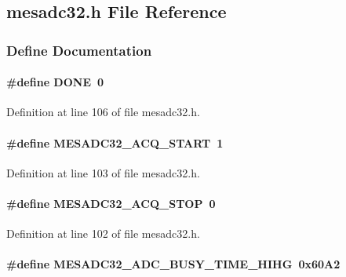 \subsection{mesadc32.h File Reference}
\label{mesadc32_8h}


\subsubsection{Define Documentation}
\paragraph[{DONE}]{\setlength{\rightskip}{0pt plus 5cm}\#define DONE~0}\hfill\label{mesadc32_8h_abe6b865c045f3e7c6892ef4f15ff5779}


Definition at line 106 of file mesadc32.h.
\paragraph[{MESADC32\_\-ACQ\_\-START}]{\setlength{\rightskip}{0pt plus 5cm}\#define MESADC32\_\-ACQ\_\-START~1}\hfill\label{mesadc32_8h_a5373a7a19002a8e75d304788f4fbaa33}


Definition at line 103 of file mesadc32.h.
\paragraph[{MESADC32\_\-ACQ\_\-STOP}]{\setlength{\rightskip}{0pt plus 5cm}\#define MESADC32\_\-ACQ\_\-STOP~0}\hfill\label{mesadc32_8h_a34bb95a47d77ede71131d5b098131a14}


Definition at line 102 of file mesadc32.h.
\paragraph[{MESADC32\_\-ADC\_\-BUSY\_\-TIME\_\-HIHG}]{\setlength{\rightskip}{0pt plus 5cm}\#define MESADC32\_\-ADC\_\-BUSY\_\-TIME\_\-HIHG~0x60A2}\hfill\label{mesadc32_8h_a20778b22281931afd64c06f6075ccee7}


